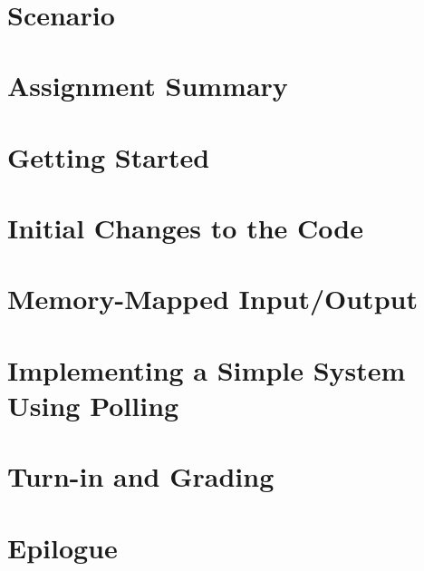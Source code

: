 \documentclass[12pt]{article}
\begin{document}
    \labidentifier\


    \softwareengineeringfrontmatter

    \section*{Scenario}                                                             \scenariointroduction

    \section{Assignment Summary}                                                    

    \section{Getting Started}                                                       

    \section{Initial Changes to the Code} \label{sec:LabTime}                       

    \section{Memory-Mapped Input/Output} \label{sec:MemMapIO}                       

    \section {Implementing a Simple System Using Polling} \label{sec:SimpleSystem}  

    \section{Turn-in and Grading}                                                   

    \section*{Epilogue}                                                             \scenariowrapup
\end{document}
